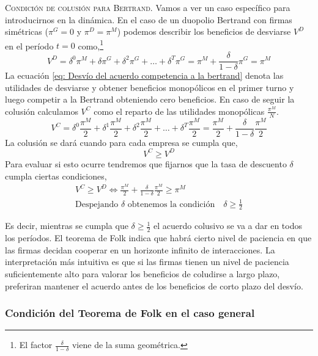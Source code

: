 \textsc{Condición de colusión para Bertrand}. Vamos a ver un caso específico para introducirnos en la dinámica. En el caso de un duopolio Bertrand con firmas simétricas ($\pi^G=0$ y $\pi^D = \pi^M$) podemos describir los beneficios de desviarse $V^D$ en el período $t=0$ como,\footnote{El factor $\frac{\delta}{1-\delta}$ viene de la suma geométrica.}
\begin{equation}
    V^D = \delta^0 \pi^M + \delta \pi^G + \delta^2 \pi^G+ \ldots + \delta^T \pi^G= \pi^M + \frac{\delta}{1-\delta} \pi^G = \pi^M \label{eq: Desvío del acuerdo competencia a la bertrand}
\end{equation}
La ecuación \ref{eq: Desvío del acuerdo competencia a la bertrand} denota las utilidades de desviarse y obtener beneficios monopólicos en el primer turno y luego competir a la Bertrand obteniendo cero beneficios. En caso de seguir la colusión calculamos $V^C$ como el reparto de las utilidades monopólicas $\frac{\pi^M}{N}$. 
\begin{equation}
    V^C = \delta^0 \frac{\pi^M}{2} + \delta ^1 \frac{\pi^M}{2} + \delta ^2 \frac{\pi^M}{2} +\ldots + \delta^T \frac{\pi^M}{2} = \frac{\pi^M}{2} + \frac{\delta}{1-\delta} \frac{\pi^M}{2}
\end{equation}
La colusión se dará cuando para cada empresa se cumpla que, 
\begin{equation}
    V^C \geq V^D
\end{equation}
Para evaluar si esto ocurre tendremos que fijarnos que la tasa de descuento $\delta$ cumpla ciertas condiciones,
\begin{align*}
    V^C \geq V^D \Longleftrightarrow \frac{\pi^M}{2} + \frac{\delta}{1-\delta} \frac{\pi^M}{2} \geq \pi^M \\
    \text{Despejando $\delta$ obtenemos la condición} \quad \delta \geq \frac{1}{2}
\end{align*}

Es decir, mientras se cumpla que $\delta \geq \frac{1}{2}$ el acuerdo colusivo se va a dar en todos los períodos. El teorema de Folk indica que habrá cierto nivel de paciencia en que las firmas decidan cooperar en un horizonte infinito de interacciones. La interpretación más intuitiva es que si las firmas tienen un nivel de paciencia suficientemente alto para valorar los beneficios de coludirse a largo plazo, preferiran mantener el acuerdo antes de los beneficios de corto plazo del desvío. 

\subsubsection*{Condición del Teorema de Folk en el caso general}


